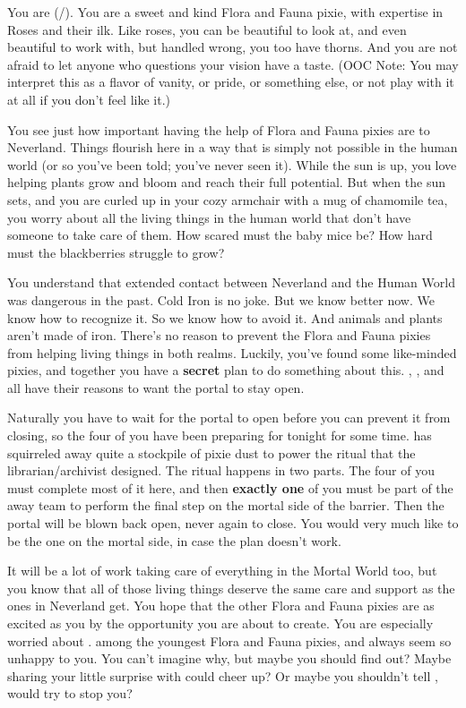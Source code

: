 \documentclass[char]{PP}
\begin{document}
\name{\cFHeart{}}

You are \cFHeart{} (\cFHeart{\They}/\cFHeart{\Them}). You are a sweet and kind Flora and Fauna pixie, with expertise in Roses and their ilk. Like roses, you can be beautiful to look at, and even beautiful to work with, but handled wrong, you too have thorns. And you are not afraid to let anyone who questions your vision have a taste. (OOC Note: You may interpret this as a flavor of vanity, or pride, or something else, or not play with it at all if you don’t feel like it.)

You see just how important having the help of Flora and Fauna pixies are to Neverland. Things flourish here in a way that is simply not possible in the human world (or so you’ve been told; you’ve never seen it). While the sun is up, you love helping plants grow and bloom and reach their full potential. But when the sun sets, and you are curled up in your cozy armchair with a mug of chamomile tea, you worry about all the living things in the human world that don’t have someone to take care of them. How scared must the baby mice be? How hard must the blackberries struggle to grow?

You understand that extended contact between Neverland and the Human World was dangerous in the past. Cold Iron is no joke. But we know better now. We know how to recognize it. So we know how to avoid it. And animals and plants aren’t made of iron. There’s no reason to prevent the Flora and Fauna pixies from helping living things in both realms. Luckily, you’ve found some like-minded pixies, and together you have a \textbf{secret} plan to do something about this. \cSLibrarian{}, \cESweet{}, and \cMIron{} all have their reasons to want the portal to stay open. 

Naturally you have to wait for the portal to open before you can prevent it from closing, so the four of you have been preparing for tonight for some time. \cMIron{} has squirreled away quite a stockpile of pixie dust to power the ritual that the librarian/archivist designed. The ritual happens in two parts. The four of you must complete most of it here, and then \textbf{exactly one} of you must be part of the away team to perform the final step on the mortal side of the barrier. Then the portal will be blown back open, never again to close. You would very much like to be the one on the mortal side, in case the plan doesn’t work.

It will be a lot of work taking care of everything in the Mortal World too, but you know that all of those living things deserve the same care and support as the ones in Neverland get. You hope that the other Flora and Fauna pixies are as excited as you by the opportunity you are about to create. You are especially worried about \cFWanabe{}. \cFWanabe{\They} \cFWanabe{\are} among the youngest Flora and Fauna pixies, and \cFWanabe{\they} always seem\cFWanabe{\plural} so unhappy to you. You can’t imagine why, but maybe you should find out? Maybe sharing your little surprise with \cFWanabe{\them} could cheer \cFWanabe{\them} up? Or maybe you shouldn’t tell \cFWanabe{\them}, would \cFWanabe{\they} try to stop you?
\end{document}
